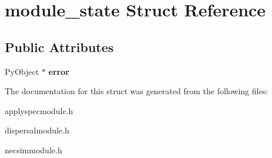 \hypertarget{structmodule__state}{}\section{module\+\_\+state Struct Reference}
\label{structmodule__state}
\subsection*{Public Attributes}
\begin{DoxyCompactItemize}
\item 
Py\+Object $\ast$ {\bfseries error}\hypertarget{structmodule__state_a6593da300121fe46fad3e7280053fab8}{}\label{structmodule__state_a6593da300121fe46fad3e7280053fab8}

\end{DoxyCompactItemize}


The documentation for this struct was generated from the following files\+:\begin{DoxyCompactItemize}
\item 
applyspecmodule.\+h\item 
dispersalmodule.\+h\item 
necsimmodule.\+h\end{DoxyCompactItemize}

